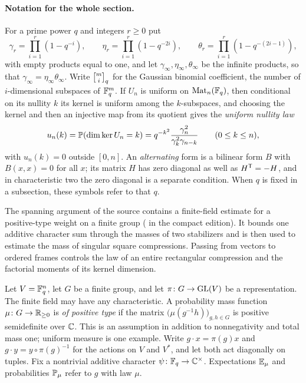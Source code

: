 \paragraph{Notation for the whole section.}
For a prime power $q$ and integers $r\ge0$ put
\[
 \gamma_r=\prod_{i=1}^r(1-q^{-i}),\qquad
 \eta_r=\prod_{i=1}^r(1-q^{-2i}),\qquad
 \theta_r=\prod_{i=1}^r(1-q^{-(2i-1)}),
\]
with empty products equal to one, and let $\gamma_\infty,\eta_\infty,\theta_\infty$ be the
infinite products, so that $\gamma_\infty=\eta_\infty\theta_\infty$. Write $\spnqbin{m}{i}{q}$
for the Gaussian binomial coefficient, the number of $i$-dimensional subspaces of $\mathbb{F}_q^m$. If
$U_n$ is uniform on $\operatorname{Mat}_n(\mathbb{F}_q)$, then conditional on its nullity $k$ its kernel is uniform
among the $k$-subspaces, and choosing the kernel and then an injective map from its quotient
gives the \emph{uniform nullity law}
\begin{equation}\label{spn:eq:uniform-nullity}
 u_n(k)=\mathbb{P}(\dim\ker U_n=k)=q^{-k^2}\frac{\gamma_n^2}{\gamma_k^2\gamma_{n-k}}
 \qquad(0\le k\le n),
\end{equation}
with $u_n(k)=0$ outside $[0,n]$. An \emph{alternating} form is a bilinear form $B$ with
$B(x,x)=0$ for all $x$; its matrix $H$ has zero diagonal as well as $H^{\mathsf{T}}=-H$, and in
characteristic two the zero diagonal is a separate condition. When $q$ is fixed in a subsection,
these symbols refer to that $q$.

The spanning argument of the source contains a finite-field estimate for a
positive-type weight on a finite group ( in the
compact edition). It bounds one additive character sum through the masses of
two stabilizers and is then used to estimate the mass of singular square
compressions. Passing
from vectors to ordered frames controls the law of an entire rectangular
compression and the factorial moments of its kernel dimension.

Let $V=\mathbb{F}_q^n$, let $G$ be a finite group, and let $\pi\colon G\to\operatorname{GL}(V)$ be a
representation. The finite field may have any characteristic. A probability
mass function $\mu\colon G\to\mathbb{R}_{\ge0}$ is \emph{of positive type} if the
matrix $\bigl(\mu(g^{-1}h)\bigr)_{g,h\in G}$ is positive semidefinite over
$\mathbb{C}$. This is an assumption in addition to nonnegativity and total mass one;
uniform measure is one example. Write $g\cdot x=\pi(g)x$ and
$g\cdot y=y\circ\pi(g)^{-1}$ for the actions on $V$ and $V^*$, and let both act
diagonally on tuples. Fix a nontrivial additive character
$\psi\colon\mathbb{F}_q\to\mathbb{C}^\times$. Expectations $\mathbb{E}_\mu$ and probabilities
$\mathbb{P}_\mu$ refer to $g$ with law $\mu$.

